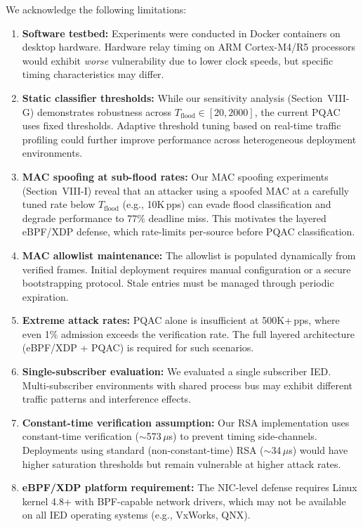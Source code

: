 \documentclass[journal]{IEEEtran}
\begin{document}
We acknowledge the following limitations:

\begin{enumerate}[leftmargin=*]
    \item \textbf{Software testbed:} Experiments were conducted in Docker containers on desktop hardware. Hardware relay timing on ARM Cortex-M4/R5 processors would exhibit \emph{worse} vulnerability due to lower clock speeds, but specific timing characteristics may differ.
    \item \textbf{Static classifier thresholds:} While our sensitivity analysis (Section~VIII-G) demonstrates robustness across $T_{\text{flood}} \in [20, 2000]$, the current PQAC uses fixed thresholds. Adaptive threshold tuning based on real-time traffic profiling could further improve performance across heterogeneous deployment environments.
    \item \textbf{MAC spoofing at sub-flood rates:} Our MAC spoofing experiments (Section~VIII-I) reveal that an attacker using a spoofed MAC at a carefully tuned rate below $T_{\text{flood}}$ (e.g., 10K\,pps) can evade flood classification and degrade performance to 77\% deadline miss. This motivates the layered eBPF/XDP defense, which rate-limits per-source before PQAC classification.
    \item \textbf{MAC allowlist maintenance:} The allowlist is populated dynamically from verified frames. Initial deployment requires manual configuration or a secure bootstrapping protocol. Stale entries must be managed through periodic expiration.
    \item \textbf{Extreme attack rates:} PQAC alone is insufficient at 500K+\,pps, where even 1\% admission exceeds the verification rate. The full layered architecture (eBPF/XDP + PQAC) is required for such scenarios.
    \item \textbf{Single-subscriber evaluation:} We evaluated a single subscriber IED. Multi-subscriber environments with shared process bus may exhibit different traffic patterns and interference effects.
    \item \textbf{Constant-time verification assumption:} Our RSA implementation uses constant-time verification ($\sim$573\,$\mu$s) to prevent timing side-channels. Deployments using standard (non-constant-time) RSA ($\sim$34\,$\mu$s) would have higher saturation thresholds but remain vulnerable at higher attack rates.
    \item \textbf{eBPF/XDP platform requirement:} The NIC-level defense requires Linux kernel 4.8+ with BPF-capable network drivers, which may not be available on all IED operating systems (e.g., VxWorks, QNX).
\end{enumerate}
\end{document}
